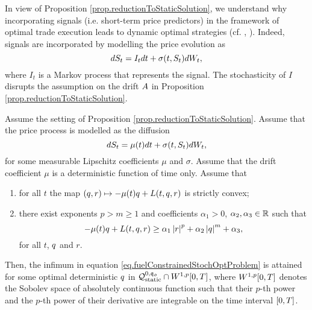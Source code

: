 \documentclass[10pt,a4paper]{article}
\begin{document}
\begin{remark}
In view of Proposition \ref{prop.reductionToStaticSolution}, we understand why incorporating signals (i.e. short-term price predictors) in the framework of optimal trade execution leads to dynamic optimal strategies (cf. \cite{CJ16inc}, \cite{LN19inc}). Indeed, signals are incorporated by modelling the price evolution as \[
dS_t = I_t dt + \sigma(t,S_t)dW_t,
\]
where $I_t$ is a Markov process that represents the signal. The stochasticity of $I$ disrupts the assumption on the drift $A$ in Proposition \ref{prop.reductionToStaticSolution}.
\end{remark}

\begin{corol}
\label{corol.reductionToOptimalStatic}
Assume the setting of Proposition \ref{prop.reductionToStaticSolution}. Assume that the  price  process is modelled as the diffusion 
\begin{equation}\label{eq.SDEofFundamentalPrice}
	dS_t = \mu(t)dt +\sigma(t,S_t)dW_t,
\end{equation}
for some measurable Lipschitz coefficients $\mu$ and $\sigma$. Assume that the drift coefficient $\mu$ is a deterministic function of time only.
Assume that  
\begin{enumerate}
\item for all $t$ the map $(q, r)\mapsto -\mu(t)q + L(t,q,r)$ is strictly convex;
\item there exist exponents $p>m\geq 1$ and coefficients $\alpha_1>0$, $\alpha_2,\alpha_3 \in \mathbb{R}$ such that 
\begin{equation*}
-\mu(t)q + L(t,q, r) \geq \alpha_1 \left\lvert {r} \right\rvert^{p} + \alpha_2 \left\lvert {q} \right\rvert^m + \alpha_3,
\end{equation*}
for all $t$, $q$ and $r$. 
\end{enumerate} 
Then, the infimum in equation \eqref{eq.fuelConstrainedStochOptProblem} is attained for some optimal deterministic $q$ in $\mathcal{Q}_{\text{static}}^{0,\mathfrak{q_0}} \cap W^{1,p}{[0,T]}$, where $W^{1,p}{[0,T]}$ denotes the Sobolev space of absolutely continuous function such that their $p$-th power and the $p$-th power of their derivative are integrable on the time interval ${[0,T]}$. 
\end{corol}
\end{document}
